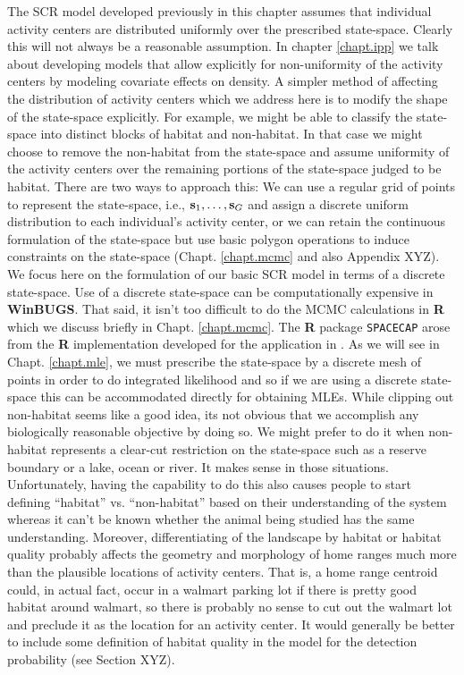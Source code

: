 The SCR model developed previously in this chapter assumes that
individual activity centers are distributed uniformly over the
prescribed state-space. Clearly this will not always be a reasonable
assumption. In chapter \ref{chapt.ipp} we talk about developing models that allow
explicitly for non-uniformity of the activity centers by modeling
covariate effects on density. A simpler method of affecting the
distribution of activity centers which we address here is to modify
the shape of the state-space explicitly. For example, we might be able
to classify the state-space into distinct blocks of habitat and
non-habitat. In that case we might choose to remove the non-habitat
from the state-space and assume uniformity of the activity centers
over the remaining portions of the state-space judged to be habitat.
There are two ways to approach this: We can use a regular grid of
points to represent the state-space, i.e., ${\bf s}_1, \ldots, {\bf s}_{G}$ and assign a
discrete uniform distribution to each individual's activity center, or
we can retain the continuous formulation of the state-space but use
basic polygon operations to induce constraints on the state-space
(Chapt. \ref{chapt.mcmc} and also Appendix XYZ). We focus here on the formulation
of our basic SCR model in terms of a discrete state-space.  Use of a
discrete state-space can be computationally expensive in {\bf WinBUGS}. That
said, it isn't too difficult to do the MCMC calculations in {\bf R} which we
discuss briefly in Chapt. \ref{chapt.mcmc}. The {\bf R} package {\tt SPACECAP}
\citep{gopalaswamy_etal:2011} arose from the {\bf R} implementation
developed for the application in \citet{royle_etal:2009}.
As we will see in Chapt. \ref{chapt.mle}, we must prescribe the
state-space by a discrete mesh of points in order to do integrated
likelihood and so if we are using a discrete state-space this can be
accommodated directly for obtaining MLEs.  While clipping out
non-habitat seems like a good idea, its not obvious that we accomplish
any biologically reasonable objective by doing so. We might prefer to
do it when non-habitat represents a clear-cut restriction on the
state-space such as a reserve boundary or a lake, ocean or river. It
makes sense in those situations.  Unfortunately, having the capability
to do this also causes people to start defining ``habitat''
vs. ``non-habitat'' based on their understanding of the system whereas
it can't be known whether the animal being studied has the same
understanding. Moreover, differentiating of the landscape by habitat
or habitat quality probably affects the geometry and morphology of
home ranges much more than the plausible locations of activity
centers. That is, a home range centroid could, in actual fact, occur
in a walmart parking lot if there is pretty good habitat around
walmart, so there is probably no sense to cut out the walmart lot and
preclude it as the location for an activity center.  It would
generally be better to include some definition of habitat quality in
the model for the detection probability (see Section XYZ).


